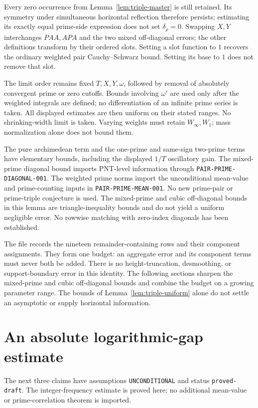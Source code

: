 \documentclass[11pt]{article}
\begin{document}
Every zero occurrence from Lemma~\ref{lem:triple-master} is still retained.
Its symmetry under simultaneous horizontal reflection therefore persists;
estimating its exactly equal prime-side expression does not set
\(\delta_\rho=0\). Swapping \(X,Y\) interchanges \(PAA,APA\) and the two
mixed off-diagonal errors; the other definitions transform by their
ordered slots. Setting a slot function to \(1\) recovers the ordinary
weighted pair Cauchy--Schwarz bound. Setting its base to \(1\) does not
remove that slot.

The limit order remains fixed \(T,X,Y,\omega\), followed by removal of
absolutely convergent prime or zero cutoffs. Bounds involving \(\omega'\)
are used only after the weighted integrals are defined; no differentiation
of an infinite prime series is taken. All displayed estimates are then
uniform on their stated ranges. No shrinking-width limit is taken.
Varying weights must retain \(W_\infty,W_1\); mass normalization alone
does not bound them.

The pure archimedean term and the one-prime and same-sign two-prime terms
have elementary bounds, including the displayed \(1/T\) oscillatory gain.
The mixed-prime diagonal bound imports PNT-level information through
\texttt{PAIR-PRIME-DIAGONAL-001}. The weighted prime norms import the
unconditional mean-value and prime-counting inputs in
\texttt{PAIR-PRIME-MEAN-001}. No new prime-pair or prime-triple conjecture is
used. The mixed-prime and cubic off-diagonal bounds in this lemma are triangle-inequality
bounds and do not yield a uniform negligible error. No rowwise matching
with zero-index diagonals has been established.

The file  records the nineteen
remainder-containing rows and their component assignments. They form one budget:
an aggregate error and its component terms must never both be added.
There is no height-truncation, desmoothing, or support-boundary error in
this identity. The following sections sharpen the mixed-prime and cubic
off-diagonal bounds and combine the budget on a growing parameter range.
The bounds of Lemma~\ref{lem:triple-uniform} alone do not settle an
asymptotic or supply horizontal information.

\section{An absolute logarithmic-gap estimate}

The next three claims have assumptions \texttt{UNCONDITIONAL} and status
\texttt{proved-draft}. The integer-frequency estimate is proved here;
no additional mean-value or prime-correlation theorem is imported.
\end{document}
